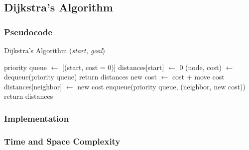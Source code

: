 \subsection{Dijkstra's Algorithm}

\subsubsection{Pseudocode}
\begin{algorithm}[H]
	\caption{Dijkstra's Algorithm (\textit{start, goal})}
	\label{alg:dijkstra}
	\begin{algorithmic}[1]
	\State priority queue $\gets$ [(start, cost = 0)]
	\State distances[start] $\gets$ 0
		\State (node, cost) $\gets$ dequeue(priority queue)
			\State return distances
		\EndIf
			\State new cost $\gets$ cost + move cost
				\State distances[neighbor] $\gets$ new cost
				\State enqueue(priority queue, (neighbor, new cost))
			\EndIf
		\EndFor
	\EndWhile
	\State return distances
	\end{algorithmic}
\end{algorithm}

\subsubsection{Implementation}

\subsubsection{Time and Space Complexity}

